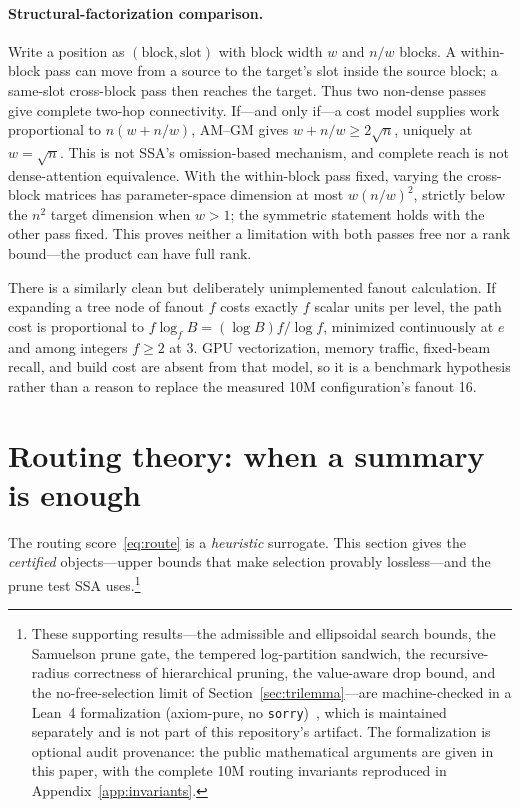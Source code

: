 \documentclass[11pt]{article}
\numberwithin{equation}{section}
\begin{document}
\paragraph{Structural-factorization comparison.} Write a position as $(\text{block},\text{slot})$ with block
width $w$ and $n/w$ blocks. A within-block pass can move from a source to the target's slot inside the source
block; a same-slot cross-block pass then reaches the target. Thus two non-dense passes give complete two-hop
connectivity. If---and only if---a cost model supplies work proportional to $n(w+n/w)$, AM--GM gives
$w+n/w\ge2\sqrt n$, uniquely at $w=\sqrt n$. This is not SSA's omission-based mechanism, and complete reach
is not dense-attention equivalence. With the within-block pass fixed, varying the cross-block matrices has
parameter-space dimension at most $w(n/w)^2$, strictly below the $n^2$ target dimension when $w>1$; the
symmetric statement holds with the other pass fixed. This proves neither a limitation with both passes free
nor a rank bound---the product can have full rank.

There is a similarly clean but deliberately unimplemented fanout calculation. If expanding a tree node of
fanout $f$ costs exactly $f$ scalar units per level, the path cost is proportional to
$f\log_f B=(\log B)f/\log f$, minimized continuously at $e$ and among integers $f\ge2$ at 3. GPU
vectorization, memory traffic, fixed-beam recall, and build cost are absent from that model, so it is a
benchmark hypothesis rather than a reason to replace the measured 10M configuration's fanout 16.

\section{Routing theory: when a summary is enough}\label{sec:routing}

The routing score~\eqref{eq:route} is a \emph{heuristic} surrogate. This section gives the \emph{certified}
objects---upper bounds that make selection provably lossless---and the prune test SSA uses.\footnote{These
supporting results---the admissible and ellipsoidal search bounds, the Samuelson prune gate, the tempered
log-partition sandwich, the recursive-radius correctness of hierarchical pruning, the value-aware drop bound,
and the no-free-selection limit of Section~\ref{sec:trilemma}---are machine-checked in a Lean~4 formalization
(axiom-pure, no \texttt{sorry})~\cite{lean}, which is maintained separately and is not part of this
repository's artifact. The formalization is optional audit provenance: the public mathematical arguments are
given in this paper, with the complete 10M routing invariants reproduced in Appendix~\ref{app:invariants}.}
\end{document}

